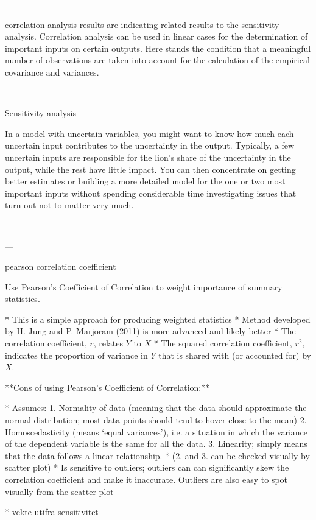 ---

correlation analysis results are indicating related results to the sensitivity analysis. Correlation analysis can be used in linear cases for the determination of important inputs on certain outputs. Here stands the condition that a meaningful number of observations are taken into account for the calculation of the empirical covariance and variances.

---

Sensitivity analysis

In a model with uncertain variables, you might want to know how much each uncertain input contributes to the uncertainty in the output. Typically, a few uncertain inputs are responsible for the lion’s share of the uncertainty in the output, while the rest have little impact. You can then concentrate on getting better estimates or building a more detailed model for the one or two most important inputs without spending considerable time investigating issues that turn out not to matter very much.

---

---

pearson correlation coefficient

Use Pearson's Coefficient of Correlation to weight importance of summary statistics.

* This is a simple approach for producing weighted statistics 
    * Method developed by H. Jung and P. Marjoram (2011) is more advanced and likely better
* The correlation coefficient, $r$, relates $Y$ to $X$ 
* The squared correlation coefficient, $r^2$, indicates the proportion of variance in $Y$ that is shared with (or accounted for) by $X$.

**Cons of using Pearson's Coefficient of Correlation:**

* Assumes:
    1. Normality of data (meaning that the data should approximate the normal distribution; most data points should tend to hover close to the mean)
    2. Homoscedasticity (means ‘equal variances’), i.e. a situation in which the variance of the dependent variable is the same for all the data.
    3. Linearity; simply means that the data follows a linear relationship. 
* (2. and 3. can be checked visually by scatter plot)
* Is sensitive to outliers; outliers can can significantly skew the correlation coefficient and make it inaccurate. Outliers are also easy to spot visually from the scatter plot

* vekte utifra sensitivitet


